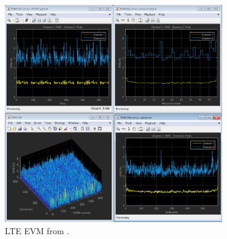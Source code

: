\begin{figure}[htbp]
    \centering
    \includegraphics[width=0.85\textwidth]{./figures/evm}
    \caption{ LTE EVM from \cite{web:lteexamplewiki}.
    \label{fig:lteevmiio}}
\end{figure}
